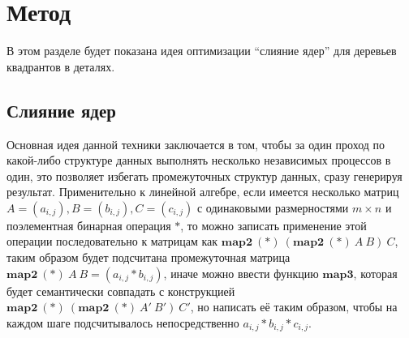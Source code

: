 
\section{Метод}
В этом разделе будет показана идея оптимизации \enquote{слияние ядер} для деревьев квадрантов в деталях.
\subsection{Слияние ядер}
Основная идея данной техники заключается в том, чтобы за один проход по какой-либо структуре данных выполнять несколько независимых процессов в один, это позволяет избегать промежуточных структур данных, сразу генерируя результат. Применительно к линейной алгебре, если имеется несколько матриц $A = (a_{i, j}), B = (b_{i, j}), C = (c_{i, j})$ с одинаковыми размерностями $m \times n$ и поэлементная бинарная  операция $*$, то можно записать применение этой операции последовательно к матрицам как $\mathbf{map2} \ (*) \ (\mathbf{map2}\ (*)\ A \ B) \ C$, таким образом будет подсчитана промежуточная матрица $\mathbf{map2}\ (*)\ A \ B = (a_{i, j} * b_{i, j})$, иначе можно ввести функцию $\mathbf{map3}$, которая будет семантически совпадать с конструкцией $\mathbf{map2}\ (*) \ (\mathbf{map2}\ (*)\ A' \ B') \ C'$, но написать её таким образом, чтобы на каждом шаге подсчитывалось непосредственно $a_{i, j} * b_{i, j} * c_{i, j}$.
